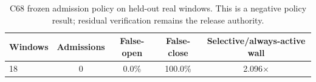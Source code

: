 \begin{table}[t]
\centering
\caption{C68 frozen admission policy on held-out real windows. This is a negative policy result; residual verification remains the release authority.}
\label{tab:c68-negative}
\scriptsize
\begin{tabular}{@{}lcccc@{}}
\toprule
Windows & Admissions & False-open & False-close & Selective/always-active wall \\
\midrule
18 & 0 & 0.0\% & 100.0\% & 2.096$\times$ \\
\bottomrule
\end{tabular}
\end{table}
